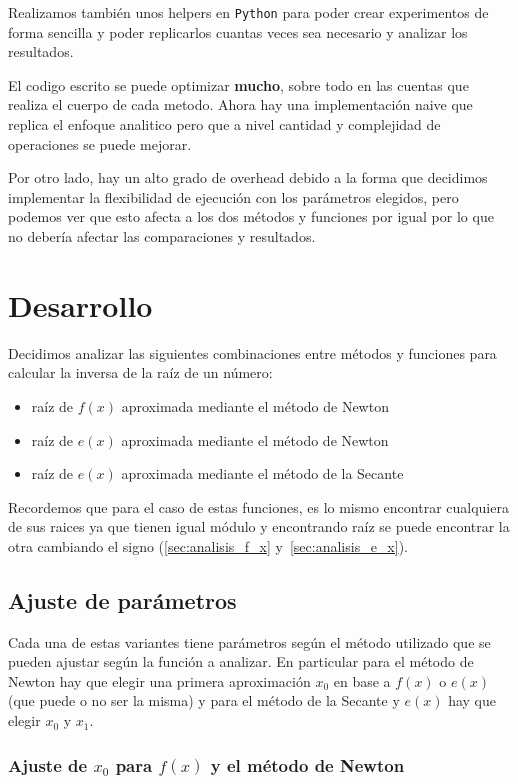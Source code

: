 Realizamos también unos helpers en \verb|Python| para poder crear experimentos
de forma sencilla y poder replicarlos cuantas veces sea necesario y analizar
los resultados.

El codigo escrito se puede optimizar \textbf{mucho}, sobre todo en las cuentas
que realiza el cuerpo de cada metodo. Ahora hay una implementación naive que
replica el enfoque analitico pero que a nivel cantidad y complejidad de
operaciones se puede mejorar.

Por otro lado, hay un alto grado de overhead debido a la forma que decidimos
implementar la flexibilidad de ejecución con los parámetros elegidos, pero
podemos ver que esto afecta a los dos métodos y funciones por igual por lo que
no debería afectar las comparaciones y resultados.

\newpage
\section{Desarrollo}

Decidimos analizar las siguientes combinaciones entre métodos y funciones para
calcular la inversa de la raíz de un número:

\begin{itemize}
    \item raíz de $f(x)$ aproximada mediante el método de Newton
    \item raíz de $e(x)$ aproximada mediante el método de Newton
    \item raíz de $e(x)$ aproximada mediante el método de la Secante
\end{itemize}

Recordemos que para el caso de estas funciones, es lo mismo encontrar
cualquiera de sus raices ya que tienen igual módulo y encontrando raíz se puede
encontrar la otra cambiando el signo (\ref{sec:analisis_f_x}
y~\ref{sec:analisis_e_x}).

\subsection{Ajuste de parámetros}

Cada una de estas variantes tiene parámetros según el método utilizado que se
pueden ajustar según la función a analizar. En particular para el método de
Newton hay que elegir una primera aproximación $x_0$ en base a $f(x)$ o $e(x)$
(que puede o no ser la misma) y para el método de la Secante y $e(x)$ hay que
elegir $x_0$ y $x_1$.

\subsubsection{Ajuste de $x_0$ para $f(x)$ y el método de Newton}


